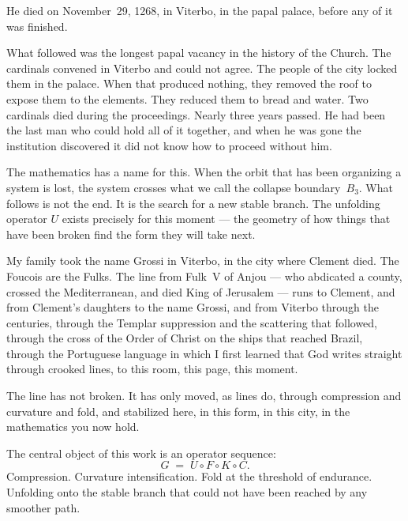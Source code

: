 \documentclass[12pt, oneside]{book}
\theoremstyle{plain}
\theoremstyle{definition}
\theoremstyle{remark}
\begin{document}
\vspace{0.4cm}
\noindent He died on November~29, 1268, in Viterbo,
in the papal palace, before any of it was finished.

\vspace{0.4cm}
\noindent What followed was the longest papal vacancy in
the history of the Church. The cardinals convened in
Viterbo and could not agree. The people of the city
locked them in the palace. When that produced nothing,
they removed the roof to expose them to the elements.
They reduced them to bread and water. Two cardinals died
during the proceedings. Nearly three years passed.
He had been the last man who could hold all of it
together, and when he was gone the institution
discovered it did not know how to proceed without him.

\vspace{0.4cm}
\noindent The mathematics has a name for this. When the
orbit that has been organizing a system is lost, the
system crosses what we call the collapse boundary~$B_3$.
What follows is not the end. It is the search for a new
stable branch. The unfolding operator $U$ exists precisely
for this moment --- the geometry of how things that have
been broken find the form they will take next.

\vspace{0.4cm}
\noindent My family took the name Grossi in Viterbo,
in the city where Clement died. The Foucois are the Fulks.
The line from Fulk~V of Anjou --- who abdicated a county,
crossed the Mediterranean, and died King of Jerusalem ---
runs to Clement, and from Clement's daughters to the name
Grossi, and from Viterbo through the centuries, through
the Templar suppression and the scattering that followed,
through the cross of the Order of Christ on the ships
that reached Brazil, through the Portuguese language in
which I first learned that God writes straight through
crooked lines, to this room, this page, this moment.

\vspace{0.4cm}
\noindent The line has not broken. It has only moved,
as lines do, through compression and curvature and fold,
and stabilized here, in this form, in this city,
in the mathematics you now hold.

\vspace{0.4cm}
\noindent The central object of this work is an operator sequence:
\[
  G \;=\; U \circ F \circ K \circ C.
\]
Compression. Curvature intensification. Fold at the threshold
of endurance. Unfolding onto the stable branch that could
not have been reached by any smoother path.
\end{document}
